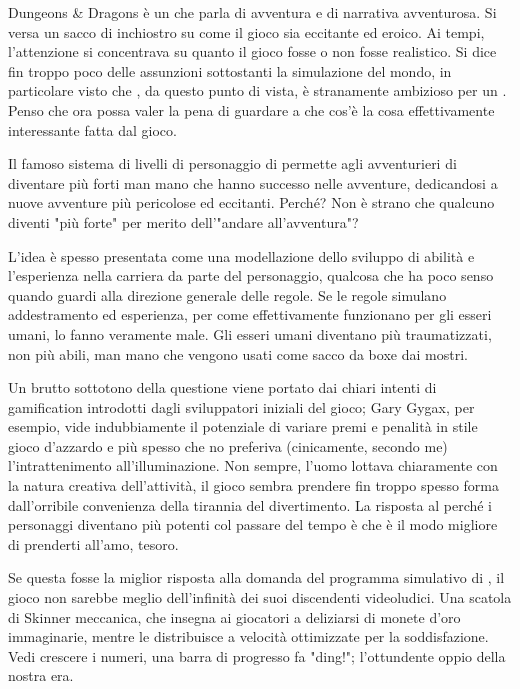 
Dungeons \& Dragons è un  che parla di avventura e di narrativa avventurosa. Si versa un sacco di inchiostro su come il gioco sia eccitante ed eroico. Ai tempi, l'attenzione si concentrava su quanto il gioco fosse o non fosse realistico. Si dice fin troppo poco delle assunzioni sottostanti la simulazione del mondo, in particolare visto che \dnd{}, da questo punto di vista, è stranamente ambizioso per un . Penso che ora possa valer la pena di guardare a che cos'è la cosa effettivamente interessante fatta dal gioco.


Il famoso sistema di livelli di personaggio di \dnd{} permette agli avventurieri di diventare più forti man mano che hanno successo nelle avventure, dedicandosi a nuove avventure più pericolose ed eccitanti. Perché? Non è strano che qualcuno diventi "più forte" per merito dell'"andare all'avventura"?

L'idea è spesso presentata come una modellazione dello sviluppo di abilità e l'esperienza nella carriera da parte del personaggio, qualcosa che ha poco senso quando guardi alla direzione generale delle regole. Se le regole simulano addestramento ed esperienza, per come effettivamente funzionano per gli esseri umani, lo fanno veramente male. Gli esseri umani diventano più traumatizzati, non più abili, man mano che vengono usati come sacco da boxe dai mostri.

Un brutto sottotono della questione viene portato dai chiari intenti di gamification introdotti dagli sviluppatori iniziali del gioco; Gary Gygax, per esempio, vide indubbiamente il potenziale di variare premi e penalità in stile gioco d'azzardo e più spesso che no preferiva (cinicamente, secondo me) l'intrattenimento all'illuminazione. Non sempre, l'uomo lottava chiaramente con la natura creativa dell'attività, il gioco sembra prendere fin troppo spesso forma dall'orribile convenienza della tirannia del divertimento. La risposta al perché i personaggi diventano più potenti col passare del tempo è che è il modo migliore di prenderti all'amo, tesoro.

Se questa fosse la miglior risposta alla domanda del programma simulativo di \dnd{}, il gioco non sarebbe meglio dell'infinità dei suoi discendenti videoludici. Una scatola di Skinner meccanica, che insegna ai giocatori a deliziarsi di monete d'oro immaginarie, mentre le distribuisce a velocità ottimizzate per la soddisfazione. Vedi crescere i numeri, una barra di progresso fa "ding!"; l'ottundente oppio della nostra era.

